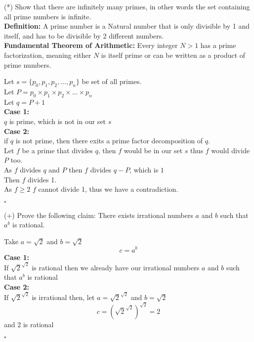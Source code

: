\documentclass{exam}
\begin{document}
\begin{questions}
    \question (*) Show that there are infinitely many primes, in other words the set containing all prime numbers is infinite.
    \\\textbf{Definition:} A prime number is a Natural number that is only divisible by 1 and itself, and has to be divisible by 2 different numbers.
    \\\textbf{Fundamental Theorem of Arithmetic:} Every integer $N > 1$ has a prime factorization, meaning either $N$ is itself prime or can be written as a product of prime numbers.
    \begin{solution}
        Let $s=\{p_0,p_1,p_2,...,p_n\}$ be set of all primes. 
        \\Let $P = p_0 \times p_1 \times p_2 \times ... \times p_n$
        \\Let $q = P+1$
        \\\textbf{Case 1:}
        \\$q$ is prime, which is not in our set $s$
        \\\textbf{Case 2:} 
        \\if $q$ is not prime, then there exits a prime factor decomposition of $q$.
        \\Let $f$ be a prime that divides $q$, then $f$ would be in our set $s$ thus $f$ would divide $P$ too. 
        \\As $f$ divides $q$ and $P$ then $f$ divides $q-P$, which is $1$
        \\Then $f$ divides 1.
        \\As $f\geq2$ $f$ cannot divide 1, thus we have a contradiction.
        \begin{flushright}
            $\square$
        \end{flushright}
    \end{solution}

    \question (+) Prove the following claim: There exists irrational numbers $a$ and $b$ such that $a^b$ is rational.
    \begin{solution}
        Take $a = \sqrt{2}$ and $b = \sqrt{2}$
        $$c = a^b$$
        \textbf{Case 1:}
        \\If $\sqrt{2} ^{\sqrt{2}}$ is rational then we already have our irrational numbers $a$ and $b$ such that $a^b$ is rational
        \\\textbf{Case 2:}
        \\If $\sqrt{2} ^{\sqrt{2}}$ is irrational then, let $a = \sqrt{2} ^{\sqrt{2}}$ and $b = \sqrt{2}$
        $$c = \left(\sqrt{2} ^{\sqrt{2}}\right)^{\sqrt{2}} = 2$$
        and 2 is rational
        \begin{flushright}
            $\square$
        \end{flushright}
    \end{solution}


\end{questions}
\end{document}
